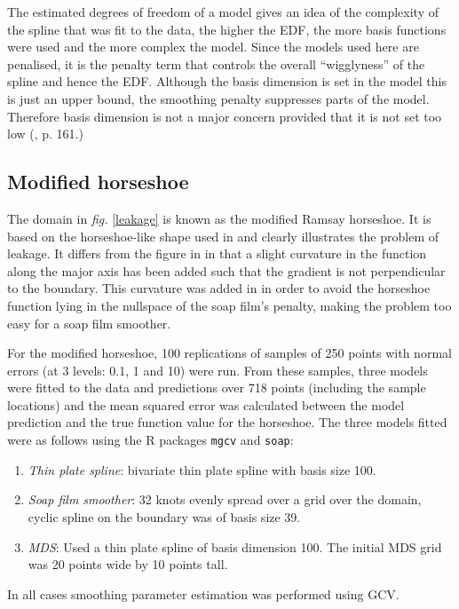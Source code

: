 \documentclass[a4paper,10pt]{article}
\newcommand{\fig}[1]{\emph{fig.} \ref{#1}}
\begin{document}
The estimated degrees of freedom of a model gives an idea of the complexity of the spline that was fit to the data, the higher the EDF, the more basis functions were used and  the more complex the model.  Since the models used here are penalised, it is the penalty term that controls the overall ``wigglyness'' of the spline and hence the EDF. Although the basis dimension is set in the model this is just an upper bound, the smoothing penalty suppresses parts of the model. Therefore basis dimension is not a major concern provided that it is not set too low (\cite{simonbook}, p. 161.) 


\subsection{Modified horseshoe}

The domain in \fig{leakage} is known as the modified Ramsay horseshoe. It is based on the horseshoe-like shape used in \cite{ramsay} and clearly illustrates the problem of leakage. It differs from the figure in \cite{ramsay} in that a slight curvature in the function along the major axis has been added such that the gradient is not perpendicular to the boundary. This curvature was added in \cite{soap}  in order to avoid the horseshoe function lying in the nullspace of the soap film's penalty, making the problem too easy for a soap film smoother.

For the modified horseshoe, 100 replications of samples of 250 points with normal errors (at 3 levels: 0.1, 1 and 10) were run. From these samples, three models were fitted to the data and predictions over 718 points (including the sample locations) and the mean squared error was calculated between the model prediction and the true function value for the horseshoe. The three models fitted were as follows using the \textsf{R} packages \texttt{mgcv} and \texttt{soap}:

\begin{enumerate}
\item \emph{Thin plate spline}: bivariate thin plate spline with basis size 100.
\item \emph{Soap film smoother}: 32 knots evenly spread over a grid over the domain, cyclic spline on the boundary was of basis size 39.
\item \emph{MDS}: Used a thin plate spline of basis dimension 100. The initial MDS grid was 20 points wide by 10 points tall.
\end{enumerate} 

In all cases smoothing parameter estimation was performed using GCV.
\end{document}
